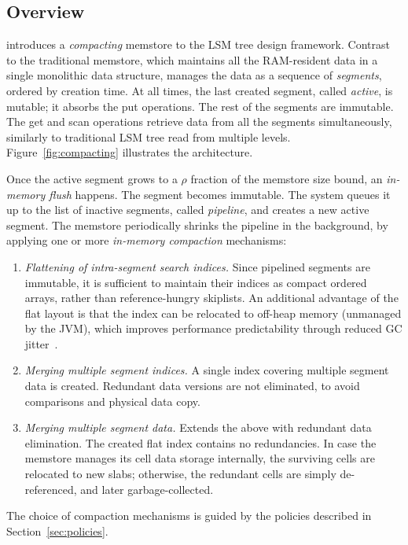 \subsection{Overview}

\begin{figure*}
\caption{\bf{LSM architecture based on compacting memstore.}}
\label{fig:compacting}
\end{figure*}

\sys\/ introduces a {\em compacting\/} memstore to the LSM tree design framework. Contrast to the traditional memstore, 
which maintains all the RAM-resident data in a single monolithic data structure, \sys\/ manages the data as a sequence of 
{\em segments}, ordered by creation time. At all times, the last created segment, called {\em active}, is mutable; it absorbs 
the put operations. The rest of the segments are immutable. The get and scan operations retrieve data from all the segments 
simultaneously, similarly to traditional LSM tree read from multiple levels. Figure~\ref{fig:compacting} illustrates the architecture. 

Once the active segment grows to a $\rho$ fraction of the memstore size bound, an {\em in-memory flush} happens.
The segment becomes immutable. The system queues it up to the list of inactive segments, called {\em pipeline}, 
and creates a new active segment. The  memstore periodically shrinks the pipeline in the background, by applying 
one or more {\em in-memory compaction} mechanisms: 
\begin{enumerate}
\item {\em Flattening of intra-segment search indices.} Since pipelined segments are immutable, it is sufficient to maintain 
their indices as compact ordered arrays, rather than reference-hungry skiplists. An additional advantage of the flat layout 
is that the index can be relocated to off-heap memory (unmanaged by the JVM), which improves performance predictability 
through reduced GC jitter~\cite{?}. 
\item {\em Merging multiple segment indices.} A single index covering multiple segment data is created. Redundant data 
versions are not eliminated, to avoid comparisons and physical data copy. 
\item  {\em Merging multiple segment data.} Extends the above with redundant data elimination. The created flat index 
contains no redundancies. In case the memstore manages its cell data storage internally, the surviving cells are relocated
to new slabs; otherwise, the redundant cells are simply de-referenced, and later garbage-collected.    
\end{enumerate} 
The choice of compaction mechanisms is guided by the policies described in Section~\ref{sec:policies}. 

